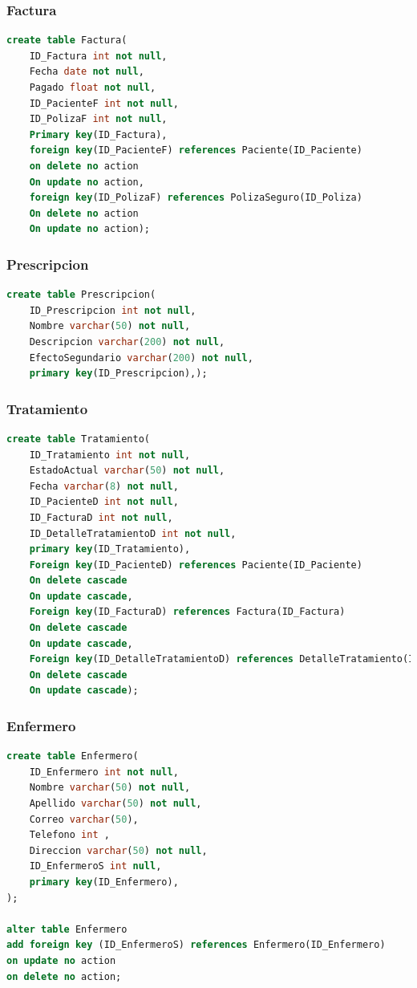 \documentclass[10pt,letterpaper]{book}
\begin{document}
\subsubsection{Factura}
\begin{lstlisting}[language=sql]
create table Factura(
	ID_Factura int not null,
	Fecha date not null,
	Pagado float not null,
	ID_PacienteF int not null,
	ID_PolizaF int not null,
	Primary key(ID_Factura),
	foreign key(ID_PacienteF) references Paciente(ID_Paciente)
	on delete no action
	On update no action,
	foreign key(ID_PolizaF) references PolizaSeguro(ID_Poliza)
	On delete no action
	On update no action);
\end{lstlisting}
\subsubsection{Prescripcion}
\begin{lstlisting}[language=sql]
create table Prescripcion(
	ID_Prescripcion int not null,
	Nombre varchar(50) not null,
	Descripcion varchar(200) not null,
	EfectoSegundario varchar(200) not null,
	primary key(ID_Prescripcion),);
\end{lstlisting}
\pagebreak
\subsubsection{Tratamiento}
\begin{lstlisting}[language=sql]
create table Tratamiento(
	ID_Tratamiento int not null,
	EstadoActual varchar(50) not null,
	Fecha varchar(8) not null,
	ID_PacienteD int not null,
	ID_FacturaD int not null,
	ID_DetalleTratamientoD int not null,
	primary key(ID_Tratamiento),
	Foreign key(ID_PacienteD) references Paciente(ID_Paciente)
	On delete cascade
	On update cascade,
	Foreign key(ID_FacturaD) references Factura(ID_Factura)
	On delete cascade
	On update cascade,
	Foreign key(ID_DetalleTratamientoD) references DetalleTratamiento(ID_DetalleTratamiento)
	On delete cascade
	On update cascade);
\end{lstlisting}
\subsubsection{Enfermero}
\begin{lstlisting}[language=sql]
create table Enfermero(
	ID_Enfermero int not null,
	Nombre varchar(50) not null,
	Apellido varchar(50) not null,
	Correo varchar(50),
	Telefono int ,
	Direccion varchar(50) not null,
	ID_EnfermeroS int null, 
	primary key(ID_Enfermero),
);

alter table Enfermero
add foreign key (ID_EnfermeroS) references Enfermero(ID_Enfermero)
on update no action
on delete no action;
\end{lstlisting}
\end{document}
